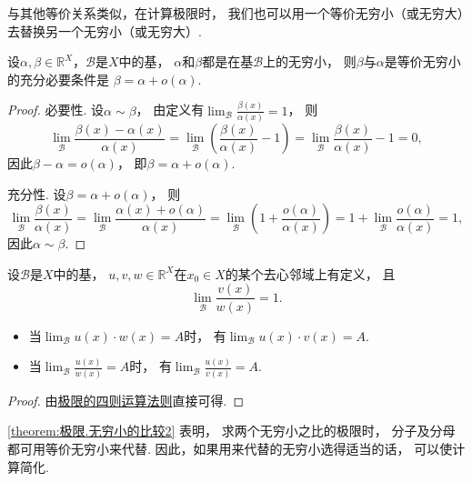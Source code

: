 与其他等价关系类似，在计算极限时，
我们也可以用一个等价无穷小（或无穷大）去替换另一个无穷小（或无穷大）.

\begin{theorem}\label{theorem:极限.无穷小的比较1}
设\(\alpha,\beta\in\mathbb{R}^X\)，\(\mathcal{B}\)是\(X\)中的基，
\(\alpha\)和\(\beta\)都是在基\(\mathcal{B}\)上的无穷小，
则\(\beta\)与\(\alpha\)是等价无穷小的充分必要条件是
\(\beta = \alpha + o(\alpha)\).
\begin{proof}
必要性.
设\(\alpha\sim\beta\)，
由定义有\(\lim_\mathcal{B} \frac{\beta(x)}{\alpha(x)} = 1\)，
则\[
	\lim_\mathcal{B} \frac{\beta(x)-\alpha(x)}{\alpha(x)}
	= \lim_\mathcal{B} \left(\frac{\beta(x)}{\alpha(x)}-1\right)
	= \lim_\mathcal{B} \frac{\beta(x)}{\alpha(x)}-1 = 0,
\]
因此\(\beta-\alpha=o(\alpha)\)，
即\(\beta=\alpha+o(\alpha)\).

充分性.
设\(\beta=\alpha+o(\alpha)\)，
则\[
	\lim_\mathcal{B} \frac{\beta(x)}{\alpha(x)}
	= \lim_\mathcal{B} \frac{\alpha(x)+o(\alpha)}{\alpha(x)}
	= \lim_\mathcal{B} \left(1+\frac{o(\alpha)}{\alpha(x)}\right)
	= 1 + \lim_\mathcal{B} \frac{o(\alpha)}{\alpha(x)}
	= 1,
\]
因此\(\alpha\sim\beta\).
\end{proof}
\end{theorem}

\begin{theorem}\label{theorem:极限.无穷小的比较2}
设\(\mathcal{B}\)是\(X\)中的基，
\(u,v,w\in\mathbb{R}^X\)在\(x_0 \in X\)的某个去心邻域上有定义，
且\[
	\lim_\mathcal{B} \frac{v(x)}{w(x)} = 1.
\]
\begin{itemize}
	\item 当\(\lim_\mathcal{B} u(x) \cdot w(x) = A\)时，
	有\(\lim_\mathcal{B} u(x) \cdot v(x) = A\).

	\item 当\(\lim_\mathcal{B} \frac{u(x)}{w(x)} = A\)时，
	有\(\lim_\mathcal{B} \frac{u(x)}{v(x)} = A\).
\end{itemize}
\begin{proof}
由\hyperref[theorem:极限.极限的四则运算法则]{极限的四则运算法则}直接可得.
\end{proof}
\end{theorem}

\cref{theorem:极限.无穷小的比较2} 表明，
求两个无穷小之比的极限时，
分子及分母都可用等价无穷小来代替.
因此，如果用来代替的无穷小选得适当的话，
可以使计算简化.


